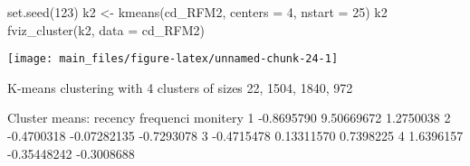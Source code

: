 \begin{Schunk}
\begin{Sinput}
set.seed(123)
k2 <- kmeans(cd_RFM2, centers = 4, nstart = 25)
k2
fviz_cluster(k2, data = cd_RFM2)
\end{Sinput}


\begin{center}\texttt{[image: main\_files/figure-latex/unnamed-chunk-24-1]} \end{center}

\begin{Soutput}
K-means clustering with 4 clusters of sizes 22, 1504, 1840, 972

Cluster means:
     recency   frequenci   monitery
1 -0.8695790  9.50669672  1.2750038
2 -0.4700318 -0.07282135 -0.7293078
3 -0.4715478  0.13311570  0.7398225
4  1.6396157 -0.35448242 -0.3008688


\end{Soutput}
\end{Schunk}
